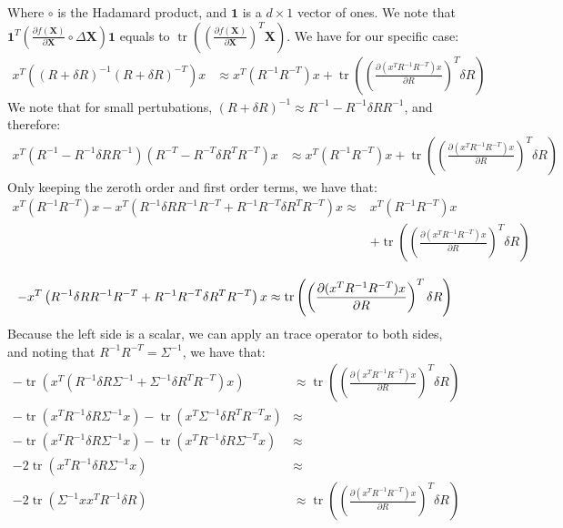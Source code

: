 \documentclass[10pt]{article}
\DeclareMathOperator{\Tr}{tr}
\begin{document}
Where $\circ$ is the Hadamard product, and $\mathbf{1}$ is a $d\times 1$ vector of ones. We note that $\mathbf{1}^T\left(\frac{\partial f(\mathbf{X})}{\partial \mathbf{X}}\circ \Delta \mathbf{X}\right)\mathbf{1}$
equals to $\Tr\left(\left(\frac{\partial f(\mathbf{X})}{\partial \mathbf{X}}\right)^T\mathbf{X}\right)$. We have for our specific case:
\begin{align*}
    x^T((R+\delta R)^{-1}(R+\delta R)^{-T})x &\approx x^T(R^{-1}R^{-T})x + \Tr\left(\left(\frac{\partial(x^TR^{-1}R^{-T})x}{\partial R}\right)^T  \delta R\right)
\end{align*}
We note that for small pertubations, $(R+\delta R)^{-1} \approx R^{-1} - R^{-1}\delta R R^{-1}$, and therefore:
\begin{align*}
    x^T (R^{-1} - R^{-1}\delta R R^{-1})(R^{-T} - R^{-T}\delta R^T R^{-T})x &\approx x^T(R^{-1}R^{-T})x + \Tr\left(\left(\frac{\partial(x^TR^{-1}R^{-T})x}{\partial R}\right)^T  \delta R\right)
\end{align*}
Only keeping the zeroth order and first order terms, we have that:
\begin{align*}
    x^T(R^{-1}R^{-T})x - x^T \left(R^{-1}\delta R R^{-1}R^{-T} + R^{-1}R^{-T}\delta R^T R^{-T}\right)x \approx& x^T(R^{-1}R^{-T})x \\&+ \Tr\left(\left(\frac{\partial(x^TR^{-1}R^{-T})x}{\partial R}\right)^T  \delta R\right)\\
\end{align*}
\begin{equation}
    - x^T \left(R^{-1}\delta R R^{-1}R^{-T} + R^{-1}R^{-T}\delta R^T R^{-T}\right)x \approx \Tr\left(\left(\frac{\partial(x^TR^{-1}R^{-T})x}{\partial R}\right)^T  \delta R\right)\\
\end{equation}
Because the left side is a scalar, we can apply an trace operator to both sides, and noting that $R^{-1}R^{-T}=\Sigma^{-1}$, we have that:
\begin{align*}
    -\Tr\left(x^T \left(R^{-1}\delta R \Sigma^{-1} + \Sigma^{-1}\delta R^T R^{-T}\right)x\right) &\approx \Tr\left(\left(\frac{\partial(x^TR^{-1}R^{-T})x}{\partial R}\right)^T  \delta R\right)\\
    -\Tr\left(x^T R^{-1}\delta R \Sigma^{-1}x\right) -\Tr\left( x^T\Sigma^{-1}\delta R^T R^{-T}x\right)&\approx\\
    -\Tr\left(x^T R^{-1}\delta R \Sigma^{-1}x\right)-\Tr\left( x^TR^{-1}\delta R \Sigma^{-T} x\right)&\approx\\
    -2\Tr\left(x^T R^{-1}\delta R \Sigma^{-1}x\right) &\approx\\
    -2\Tr\left( \Sigma^{-1}xx^T R^{-1}\delta R\right) &\approx \Tr\left(\left(\frac{\partial(x^TR^{-1}R^{-T})x}{\partial R}\right)^T  \delta R\right)
\end{align*}
\end{document}

